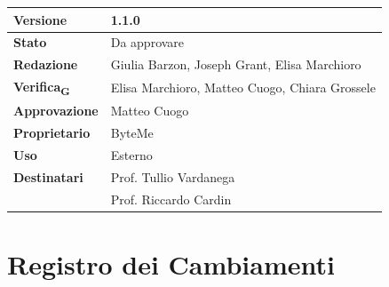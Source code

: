\documentclass[11pt,a4paper]{article}
\newcommand{\gls}[1]{#1\textsubscript{G}}
\begin{document}
\begin{titlepage}
    \begin{table}[H]
        \centering
        \begin{tabular}{|l|p{5cm}|}
            \hline
            \textbf{Versione} & 1.1.0 \\
            \hline
            \textbf{Stato} & Da approvare \\
            \hline
            \textbf{Redazione} & Giulia Barzon, Joseph Grant, Elisa Marchioro \\
            \hline
            \textbf{\gls{Verifica}} & Elisa Marchioro, Matteo Cuogo, Chiara Grossele \\
            \hline
            \textbf{Approvazione} & Matteo Cuogo \\
            \hline
            \textbf{Proprietario} & ByteMe \\
            \hline
            \textbf{Uso} & Esterno \\
            \hline
            \textbf{Destinatari} & Prof. Tullio Vardanega \\ & Prof. Riccardo Cardin \\
            \hline
        \end{tabular}
    \end{table}
    
    \vfill
\end{titlepage}

\section*{Registro dei Cambiamenti}
\end{document}
